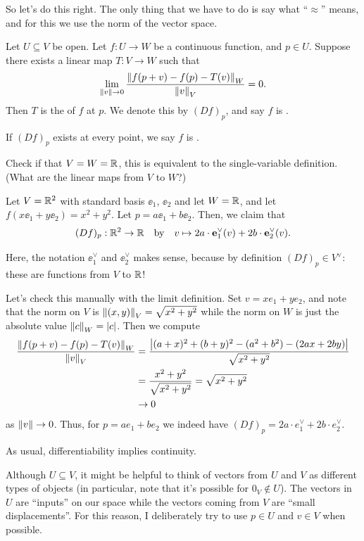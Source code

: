 So let's do this right.
The only thing that we have to do is say what ``$\approx$'' means, and for
this we use the norm of the vector space.
\begin{definition}
	Let $U \subseteq V$ be open.
	Let $f : U \to W$ be a continuous function, and $p \in U$.
	Suppose there exists a linear map $T : V \to W$ such that
	\[
		\lim_{\left\lVert v \right\rVert \to 0}
		\frac{\left\lVert f(p + v) - f(p) - T(v) \right\rVert_W}{\left\lVert v \right\rVert_V} = 0.
	\]
	Then $T$ is the  of $f$ at $p$.
	We denote this by $(Df)_p$, and say $f$ is .

	If $(Df)_p$ exists at every point, we say $f$ is .
\end{definition}

\begin{ques}
	Check if that $V = W = \mathbb R$, this is equivalent to the single-variable definition.
	(What are the linear maps from $V$ to $W$?)
\end{ques}
\begin{example}[Total derivative of $f(x,y) = x^2+y^2$]
	Let $V = \mathbb R^2$ with standard basis $\ee_1$, $\ee_2$ and let $W = \mathbb R$,
	and let $f\left( x \ee_1 + y \ee_2 \right) = x^2+y^2$.  Let $p = a\ee_1 + b\ee_2$.
	Then, we claim that \[ (Df)_p : \mathbb R^2 \to \mathbb R \quad\text{by}\quad
	v \mapsto 2a \cdot \mathbf e_1^\vee(v) + 2b \cdot \mathbf e_2^\vee(v). \]
\end{example}
Here, the notation $\ee_1^\vee$ and $\ee_2^\vee$ makes sense,
because by definition $(Df)_p \in V^\vee$: these are functions from $V$ to $\mathbb R$!

Let's check this manually with the limit definition.
Set $v = xe_1 + ye_2$, and note that the norm on $V$ is $\left\lVert (x,y) \right\rVert_V = \sqrt{x^2+y^2}$
while the norm on $W$ is just the absolute value $\left\lVert c \right\rVert_W = \left\lvert c \right\rvert$.
Then we compute
\begin{align*}
	\frac{\left\lVert f(p + v) - f(p) - T(v) \right\rVert_W}{\left\lVert v \right\rVert_V} 
	&= \frac{\left\lvert (a+x)^2 + (b+y)^2 - (a^2+b^2) - (2ax+2by) \right\rvert}{\sqrt{x^2+y^2}} \\
	&= \frac{x^2+y^2}{\sqrt{x^2+y^2}} = \sqrt{x^2+y^2} \\
	&\to 0
\end{align*}
as $\left\lVert v \right\rVert \to 0$.
Thus, for $p = ae_1 + be_2$ we indeed have $(Df)_p = 2a \cdot e_1^\vee + 2b \cdot e_2^\vee$.

\begin{remark}
	As usual, differentiability implies continuity.
\end{remark}
\begin{remark}
	Although $U \subseteq V$, it might be helpful to think of vectors from $U$ and $V$
	as different types of objects (in particular, note that it's possible for $0_V \notin U$).
	The vectors in $U$ are ``inputs'' on our space
	while the vectors coming from $V$ are ``small displacements''.
	For this reason, I deliberately try to use $p \in U$ and $v \in V$ when possible.
\end{remark}

